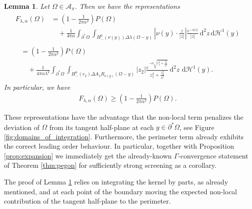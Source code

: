 \documentclass[11pt]{article}
\newcounter{statement}
\numberwithin{statement}{section}
\numberwithin{equation}{section}
\newtheorem{lemma}[statement]{Lemma}
\theoremstyle{remark}
\newcommand{\intd}{\, \mathrm{d}} 				%
\newcommand{\Hd}{\mathcal H}				%
\begin{document}
	
\begin{lemma}\label{lem:energy_on_boundary}
	Let $\Omega \in \mathcal{A}_\pi$.
	Then we have the representations
	\begin{align}\label{eq:representation_lower_bound}
	  \begin{split}
            F_{\lambda,\alpha}(\Omega)
            & = \left( 1- \frac{1}{2\pi \alpha^2}\right) P(\Omega)  \\
            &\quad + \frac{1}{4\pi \alpha} \int_{\partial^* \Omega}
            \int_{ H_-^0(\nu(y)) \Delta \lambda (\Omega - y) }
            \left| \nu(y) \cdot \frac{ z}{|z|} \right|
            \frac{e^{-\alpha|z|}}{|z|} \intd^2 z \intd \Hd^1(y)
	  \end{split}\\
	  \begin{split}
            & = \left( 1- \frac{1}{2\pi \alpha^2}\right) P(\Omega)  \\
            &\quad + \frac{1}{4\pi \alpha \lambda^2} \int_{\partial^*
              \Omega} \int_{ H_-^0(e_2) \Delta A_\lambda R_{\nu(y)}
              (\Omega - y) } \left| z_2 \right| \frac{e^{-\alpha
                \sqrt{z_1^2 + \frac{z_2^2}{\lambda^2} }}}{z_1^2 +
              \frac{z_2^2}{\lambda^2}} \intd^2 z \, \intd
            \Hd^1(y).
	  \end{split}\label{eq:representation_revised}
	\end{align}
        In particular, we have
          \begin{align}
            \label{eq:FlaP}
            F_{\lambda,\alpha}(\Omega)
            \geq \left( 1- \frac{1}{2\pi \alpha^2}\right) P(\Omega).
          \end{align}
\end{lemma}
	
	
These representations have the advantage that the non-local term
penalizes the deviation of $\Omega$ from its tangent half-plane at
each $y\in \partial^* \Omega$, see Figure
\ref{fig:domains_of_integration}.  Furthermore, the perimeter term
already exhibits the correct leading order behaviour.  In particular,
together with Proposition \ref{prop:expansion} we immediately get the
already-known $\Gamma$-convergence statement of Theorem
  \ref{thm:pegon} for sufficiently strong screening as a corollary.

The proof of Lemma \ref{lem:energy_on_boundary} relies on integrating
the kernel by parts, as already mentioned, and at each point of the
boundary moving the expected non-local contribution of the tangent
half-plane to the perimeter.
\end{document}
